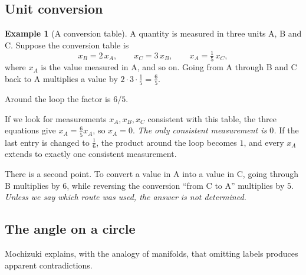 \documentclass[11pt,a4paper]{article}
\theoremstyle{plain}
\theoremstyle{definition}
\newtheorem{example}[theorem]{Example}
\theoremstyle{remark}
\begin{document}
\subsection{Unit conversion}
\begin{example}[A conversion table]
A quantity is measured in three units A, B and C. Suppose the conversion table is
\[x_B=2\,x_A,\qquad x_C=3\,x_B,\qquad x_A=\tfrac15\,x_C,\]
where $x_A$ is the value measured in A, and so on. Going from A through B and C back to A multiplies a value by
$2\cdot3\cdot\frac15=\frac65$.
\end{example}
\begin{center}

{\small Around the loop the factor is $6/5$.}
\end{center}
If we look for measurements $x_A,x_B,x_C$ consistent with this table, the three equations give $x_A=\frac65x_A$, so
$x_A=0$. \emph{The only consistent measurement is $0$.} If the last entry is changed to $\frac16$, the product around the
loop becomes $1$, and every $x_A$ extends to exactly one consistent measurement.

There is a second point. To convert a value in A into a value in C, going through B multiplies by $6$, while reversing the
conversion ``from C to A'' multiplies by $5$. \emph{Unless we say which route was used, the answer is not determined.}

\subsection{The angle on a circle}
Mochizuki explains, with the analogy of manifolds, that omitting labels produces apparent contradictions.
\end{document}
